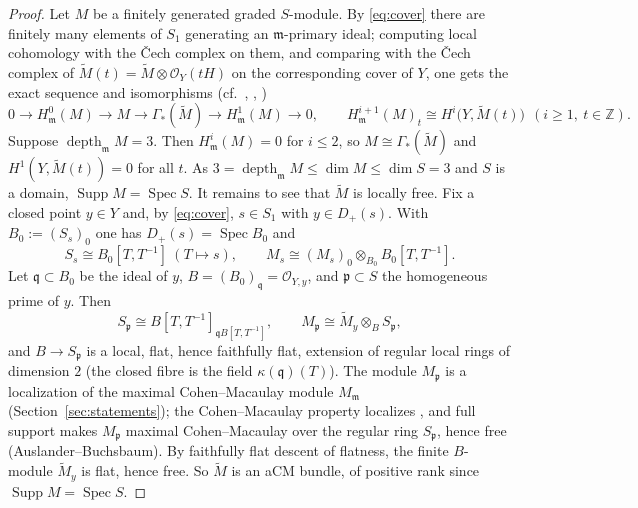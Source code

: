 \documentclass[11pt]{amsart}
\theoremstyle{remark}
\theoremstyle{definition}
\newcommand{\ZZ}{\mathbb{Z}}
\newcommand{\cO}{\mathcal{O}}
\DeclareMathOperator{\depth}{depth}
\DeclareMathOperator{\Spec}{Spec}
\DeclareMathOperator{\Supp}{Supp}
\begin{document}
\begin{proof}
Let $M$ be a finitely generated graded $S$-module. By \eqref{eq:cover} there are finitely many elements of $S_1$ generating an $\mathfrak m$-primary ideal; computing local cohomology with the \v Cech complex on them, and comparing with the \v Cech complex of $\widetilde M(t)=\widetilde M\otimes\cO_Y(tH)$ on the corresponding cover of $Y$, one gets the exact sequence and isomorphisms (cf.\ \cite[(2.1.5)]{EGA3}, \cite[(5.1.6)]{GoWa}, \cite[20.4.4]{BS})
\begin{equation}\label{eq:lc}
0\to H^0_{\mathfrak m}(M)\to M\to\Gamma_*(\widetilde M)\to H^1_{\mathfrak m}(M)\to0,\qquad
H^{i+1}_{\mathfrak m}(M)_t\cong H^i\bigl(Y,\widetilde M(t)\bigr)\ \ (i\ge1,\ t\in\ZZ).
\end{equation}
Suppose $\depth_{\mathfrak m}M=3$. Then $H^i_{\mathfrak m}(M)=0$ for $i\le2$, so $M\cong\Gamma_*(\widetilde M)$ and $H^1(Y,\widetilde M(t))=0$ for all $t$. As $3=\depth_{\mathfrak m}M\le\dim M\le\dim S=3$ and $S$ is a domain, $\Supp M=\Spec S$. It remains to see that $\widetilde M$ is locally free. Fix a closed point $y\in Y$ and, by \eqref{eq:cover}, $s\in S_1$ with $y\in D_+(s)$. With $B_0:=(S_s)_0$ one has $D_+(s)=\Spec B_0$ and
\[
S_s\cong B_0[T,T^{-1}]\ (T\mapsto s),\qquad M_s\cong(M_s)_0\otimes_{B_0}B_0[T,T^{-1}].
\]
Let $\mathfrak q\subset B_0$ be the ideal of $y$, $B=(B_0)_{\mathfrak q}=\cO_{Y,y}$, and $\mathfrak p\subset S$ the homogeneous prime of $y$. Then
\[
S_{\mathfrak p}\cong B[T,T^{-1}]_{\mathfrak qB[T,T^{-1}]},\qquad M_{\mathfrak p}\cong\widetilde M_y\otimes_BS_{\mathfrak p},
\]
and $B\to S_{\mathfrak p}$ is a local, flat, hence faithfully flat, extension of regular local rings of dimension $2$ (the closed fibre is the field $\kappa(\mathfrak q)(T)$). The module $M_{\mathfrak p}$ is a localization of the maximal Cohen--Macaulay module $M_{\mathfrak m}$ (Section~\ref{sec:statements}); the Cohen--Macaulay property localizes \cite[\S2.1]{BH}, and full support makes $M_{\mathfrak p}$ maximal Cohen--Macaulay over the regular ring $S_{\mathfrak p}$, hence free (Auslander--Buchsbaum). By faithfully flat descent of flatness, the finite $B$-module $\widetilde M_y$ is flat, hence free. So $\widetilde M$ is an aCM bundle, of positive rank since $\Supp M=\Spec S$.


\end{proof}
\end{document}
